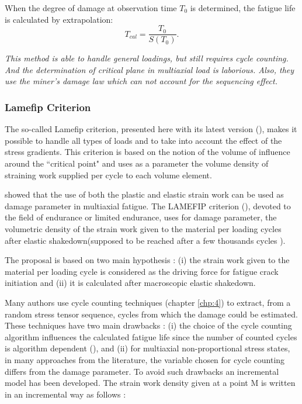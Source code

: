 When the degree of damage at observation time $T_0$ is
determined, the fatigue life is calculated by extrapolation:
$$T_{cal}=\dfrac{T_0}{S(T_0)}.$$

\textit{This method is able to handle general loadings, but still requires cycle counting. And the determination of critical plane in multiaxial load is laborious. Also, they use the miner's damage law which can not account for the sequencing effect.}

\subsubsection{Lamefip Criterion}
The so-called Lamefip criterion, presented here with its latest version (\cite{benabes2006approche}), makes it possible to handle all types of loads and to take into account the effect of the stress gradients. This criterion is based on the notion of the volume of influence around the ``critical point" and uses as a parameter the volume density of straining work supplied per cycle to each volume element.

\cite{ellyin2012fatigue} showed that the use of both the plastic and elastic strain work can be used
as damage parameter in multiaxial fatigue. The LAMEFIP criterion (\cite{banvillet2003volumetric}),
devoted to the field of endurance or limited endurance, uses for damage parameter, the volumetric density of the strain work given to the material per loading cycles after elastic shakedown(supposed to be reached after a few thousands cycles ).

The proposal is based on two main hypothesis : (i) the strain work given to the material per loading cycle is considered as the driving force for fatigue crack initiation and (ii) it is calculated after macroscopic elastic shakedown.

Many authors use cycle counting techniques (chapter \ref{chp:4}) to extract, from a random stress tensor sequence, cycles from which the damage could be estimated. These techniques have two main drawbacks : (i) the choice of the cycle counting algorithm influences the calculated fatigue life since the number of counted cycles is algorithm dependent (\cite{dowling1983fatigue}), and (ii) for multiaxial non-proportional stress states, in many approaches from the literature, the variable chosen for cycle counting differs from the damage parameter. To avoid such drawbacks an incremental model has been developed. The strain work density given at a point M is written in an incremental way as follows :

